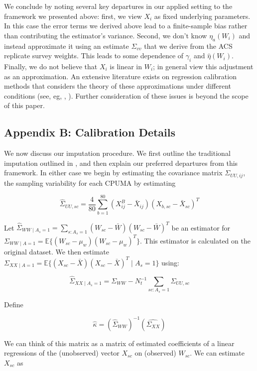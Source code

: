 \documentclass[12pt]{article}
\begin{document}
We conclude by noting several key departures in our applied setting to the framework we presented above: first, we view $X_i$ as fixed underlying parameters. In this case the error terms we derived above lead to a finite-sample bias rather than contributing the estimator's variance. Second, we don't know $\eta_a(W_i)$ and instead approximate it using an estimate $\Sigma_{vv}$ that we derive from the ACS replicate survey weights. This leads to some dependence of $\gamma_i$ and $\hat{\eta}(W_i)$. Finally, we do not believe that $X_i$ is linear in $W_i$; in general view this adjustment as an approximation. An extensive literature exists on regression calibration methods that considers the theory of these approximations under different conditions (see, eg, \cite{gleser1992importance}, \cite{carroll2006measurement}). Further consideration of these issues is beyond the scope of this paper.

\subsection{Appendix B: Calibration Details}

We now discuss our imputation procedure. We first outline the traditional imputation outlined in \cite{carroll2006measurement}, and then explain our preferred departures from this framework. In either case we begin by estimating the covariance matrix $\Sigma_{UU, ij}$, the sampling variability for each CPUMA by estimating

$$
\hat{\Sigma}_{UU, sc} = \frac{4}{80}\sum_{b=1}^{80}(X_{ij}^B - \bar{X}_{ij})(X_{b, sc} - \bar{X}_{sc})^T
$$

Let $\hat{\Sigma}_{WW \mid A_s = 1} = \sum_{s: A_s = 1} (W_{sc} - \bar{W})(W_{sc} - \bar{W})^T$ be an estimator for $\Sigma_{WW \mid A = 1} = \mathbb{E}\{(W_{sc} - \mu_w)(W_{sc} - \mu_w)^T\}$. This estimator is calculated on the original dataset. We then estimate $\Sigma_{XX \mid A = 1} = \mathbb{E}\{(X_{sc} - \bar{X})(X_{sc} - \bar{X})^T \mid A_s = 1\}$ using:

$$
\hat{\Sigma}_{XX \mid A_s = 1} = \Sigma_{WW} - N_t^{-1}\sum_{sc: A_s = 1} \Sigma_{UU, sc}
$$

Define

$$
\hat{\kappa} = (\hat{\Sigma}_{WW})^{-1}(\hat{\Sigma_{XX}})
$$

We can think of this matrix as a matrix of estimated coefficients of a linear regressions of the (unobserved) vector $X_{sc}$ on (observed) $W_{sc}$. We can estimate $X_{sc}$ as
\end{document}
